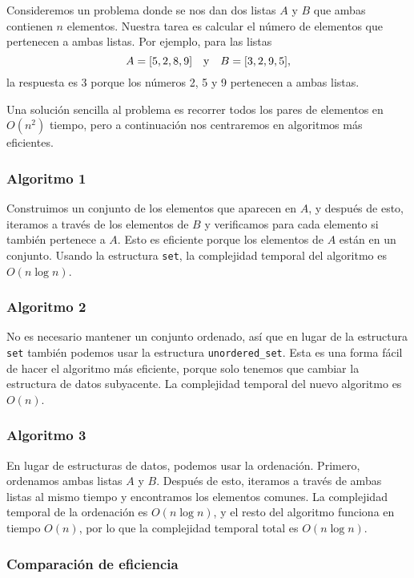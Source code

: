 Consideremos un problema donde
se nos dan dos listas $A$ y $B$
que ambas contienen $n$ elementos.
Nuestra tarea es calcular el número de elementos
que pertenecen a ambas listas.
Por ejemplo, para las listas
\[A = [5,2,8,9] \hspace{10px} \textrm{y} \hspace{10px} B = [3,2,9,5],\]
la respuesta es 3 porque los números 2, 5
y 9 pertenecen a ambas listas.

Una solución sencilla al problema es
recorrer todos los pares de elementos en $O(n^2)$ tiempo,
pero a continuación nos centraremos en
algoritmos más eficientes.

\subsubsection{Algoritmo 1}
Construimos un conjunto de los elementos que aparecen en $A$,
y después de esto, iteramos a través de los elementos
de $B$ y verificamos para cada elemento si también
pertenece a $A$.
Esto es eficiente porque los elementos de $A$
están en un conjunto.
Usando la estructura \texttt{set},
la complejidad temporal del algoritmo es $O(n \log n)$.

\subsubsection{Algoritmo 2}

No es necesario mantener un conjunto ordenado,
así que en lugar de la estructura \texttt{set}
también podemos usar la estructura \texttt{unordered\_set}.
Esta es una forma fácil de hacer el algoritmo
más eficiente, porque solo tenemos que cambiar
la estructura de datos subyacente.
La complejidad temporal del nuevo algoritmo es $O(n)$.

\subsubsection{Algoritmo 3}

En lugar de estructuras de datos, podemos usar la ordenación.
Primero, ordenamos ambas listas $A$ y $B$.
Después de esto, iteramos a través de ambas listas
al mismo tiempo y encontramos los elementos comunes.
La complejidad temporal de la ordenación es $O(n \log n)$,
y el resto del algoritmo funciona en tiempo $O(n)$,
por lo que la complejidad temporal total es $O(n \log n)$.

\subsubsection{Comparación de eficiencia}


